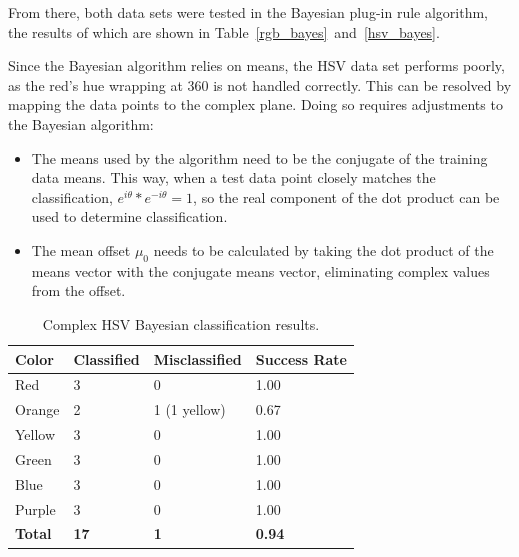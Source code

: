 \documentclass[twoside]{IEEEtran}
\begin{document}
From there, both data sets were tested in the Bayesian plug-in rule algorithm, the results of which
are shown in Table~\ref{rgb_bayes}~and~\ref{hsv_bayes}.

Since the Bayesian algorithm relies on means, the HSV data set performs poorly, as the red's hue
wrapping at 360 is not handled correctly. This can be resolved by mapping the data points to the
complex plane. Doing so requires adjustments to the Bayesian algorithm:
\begin{itemize}
    \item The means used by the algorithm need to be the conjugate of the training data means.
          This way, when a test data point closely matches the classification, \( e^{i\theta} * e^{-i\theta} = 1 \),
          so the real component of the dot product can be used to determine classification.

    \item The mean offset \( \mu_0 \) needs to be calculated by taking the dot product of the means vector
          with the conjugate means vector, eliminating complex values from the offset.
\end{itemize}

\begin{table}[!t]
    \centering

    \caption{Complex HSV Bayesian classification results.}%
    \label{hsv_complex_bayes}
    \begin{tabular}{ l l l l }
        \toprule
        \bfseries Color & \bfseries Classified & \bfseries Misclassified & \bfseries Success Rate \\
        \midrule
        Red             & 3                    & 0                       & 1.00                   \\
        Orange          & 2                    & 1 (1 yellow)            & 0.67                   \\
        Yellow          & 3                    & 0                       & 1.00                   \\
        Green           & 3                    & 0                       & 1.00                   \\
        Blue            & 3                    & 0                       & 1.00                   \\
        Purple          & 3                    & 0                       & 1.00                   \\
        \midrule
        \bfseries Total & \bfseries 17         & \bfseries 1             & \bfseries 0.94         \\
        \bottomrule
    \end{tabular}
\end{table}
\end{document}
